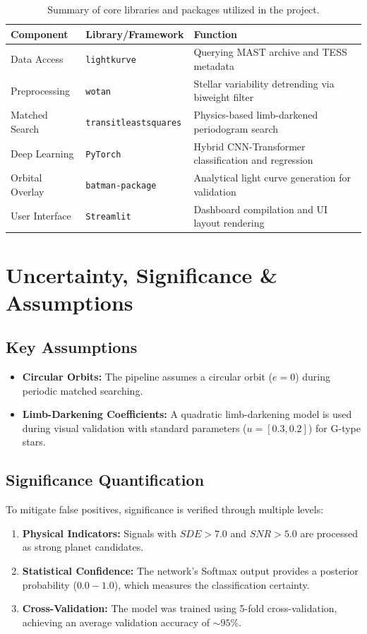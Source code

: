 \documentclass[11pt,a4paper]{article}
\begin{document}
\begin{table}[h]
    \centering
    \caption{Summary of core libraries and packages utilized in the project.}
    \begin{tabular}{lll}
        \toprule
        \textbf{Component} & \textbf{Library/Framework} & \textbf{Function} \\
        \midrule
        Data Access & \texttt{lightkurve} & Querying MAST archive and TESS metadata \\
        Preprocessing & \texttt{wotan} & Stellar variability detrending via biweight filter \\
        Matched Search & \texttt{transitleastsquares} & Physics-based limb-darkened periodogram search \\
        Deep Learning & \texttt{PyTorch} & Hybrid CNN-Transformer classification and regression \\
        Orbital Overlay & \texttt{batman-package} & Analytical light curve generation for validation \\
        User Interface & \texttt{Streamlit} & Dashboard compilation and UI layout rendering \\
        \bottomrule
    \end{tabular}
    \label{tab:libraries}
\end{table}

\section{Uncertainty, Significance \& Assumptions}
\subsection{Key Assumptions}
\begin{itemize}
    \item \textbf{Circular Orbits:} The pipeline assumes a circular orbit ($e=0$) during periodic matched searching.
    \item \textbf{Limb-Darkening Coefficients:} A quadratic limb-darkening model is used during visual validation with standard parameters ($u=[0.3, 0.2]$) for G-type stars.
\end{itemize}

\subsection{Significance Quantification}
To mitigate false positives, significance is verified through multiple levels:
\begin{enumerate}
    \item \textbf{Physical Indicators:} Signals with $SDE > 7.0$ and $SNR > 5.0$ are processed as strong planet candidates.
    \item \textbf{Statistical Confidence:} The network's Softmax output provides a posterior probability ($0.0 - 1.0$), which measures the classification certainty.
    \item \textbf{Cross-Validation:} The model was trained using 5-fold cross-validation, achieving an average validation accuracy of $\sim 95\%$.
\end{enumerate}
\end{document}
